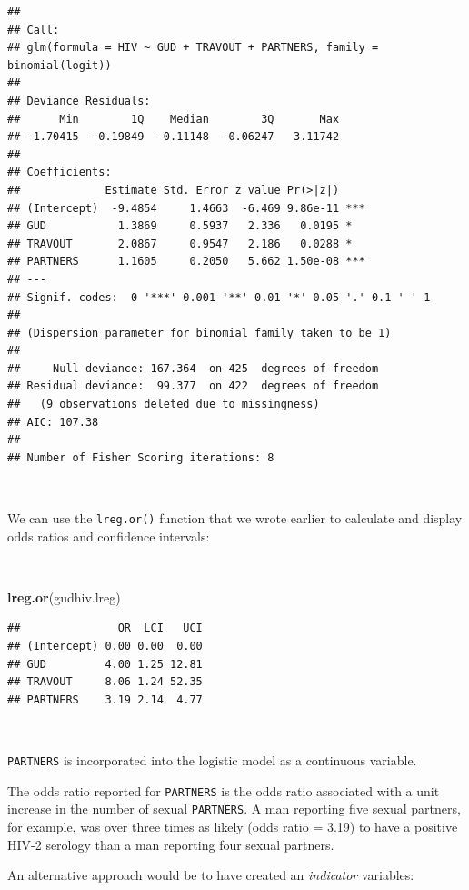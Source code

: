 \documentclass[12pt,a4paper]{book}
\newenvironment{Shaded}{\begin{snugshade}}{\end{snugshade}}
\newcommand{\KeywordTok}[1]{\textcolor[rgb]{0.13,0.29,0.53}{\textbf{#1}}}
\newcommand{\NormalTok}[1]{#1}
\theoremstyle{definition}
\theoremstyle{definition}
\theoremstyle{definition}
\theoremstyle{remark}
\begin{document}
\begin{verbatim}
## 
## Call:
## glm(formula = HIV ~ GUD + TRAVOUT + PARTNERS, family = binomial(logit))
## 
## Deviance Residuals: 
##      Min        1Q    Median        3Q       Max  
## -1.70415  -0.19849  -0.11148  -0.06247   3.11742  
## 
## Coefficients:
##             Estimate Std. Error z value Pr(>|z|)    
## (Intercept)  -9.4854     1.4663  -6.469 9.86e-11 ***
## GUD           1.3869     0.5937   2.336   0.0195 *  
## TRAVOUT       2.0867     0.9547   2.186   0.0288 *  
## PARTNERS      1.1605     0.2050   5.662 1.50e-08 ***
## ---
## Signif. codes:  0 '***' 0.001 '**' 0.01 '*' 0.05 '.' 0.1 ' ' 1
## 
## (Dispersion parameter for binomial family taken to be 1)
## 
##     Null deviance: 167.364  on 425  degrees of freedom
## Residual deviance:  99.377  on 422  degrees of freedom
##   (9 observations deleted due to missingness)
## AIC: 107.38
## 
## Number of Fisher Scoring iterations: 8
\end{verbatim}

~

We can use the \texttt{lreg.or()} function that we wrote earlier to
calculate and display odds ratios and confidence intervals:

~

\begin{Shaded}
\begin{Highlighting}[]
\KeywordTok{lreg.or}\NormalTok{(gudhiv.lreg)}
\end{Highlighting}
\end{Shaded}

\begin{verbatim}
##               OR  LCI   UCI
## (Intercept) 0.00 0.00  0.00
## GUD         4.00 1.25 12.81
## TRAVOUT     8.06 1.24 52.35
## PARTNERS    3.19 2.14  4.77
\end{verbatim}

~

\texttt{PARTNERS} is incorporated into the logistic model as a
continuous variable.

The odds ratio reported for \texttt{PARTNERS} is the odds ratio
associated with a unit increase in the number of sexual
\texttt{PARTNERS}. A man reporting five sexual partners, for example,
was over three times as likely (odds ratio = 3.19) to have a positive
HIV-2 serology than a man reporting four sexual partners.

An alternative approach would be to have created an \emph{indicator}
variables:

~
\end{document}
